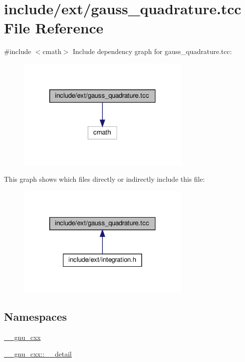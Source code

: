 \hypertarget{gauss__quadrature_8tcc}{}\section{include/ext/gauss\+\_\+quadrature.tcc File Reference}
\label{gauss__quadrature_8tcc}
{\ttfamily \#include $<$cmath$>$}\newline
Include dependency graph for gauss\+\_\+quadrature.\+tcc\+:
\nopagebreak
\begin{figure}[H]
\begin{center}
\leavevmode
\includegraphics[width=241pt]{gauss__quadrature_8tcc__incl}
\end{center}
\end{figure}
This graph shows which files directly or indirectly include this file\+:
\nopagebreak
\begin{figure}[H]
\begin{center}
\leavevmode
\includegraphics[width=241pt]{gauss__quadrature_8tcc__dep__incl}
\end{center}
\end{figure}
\subsection*{Namespaces}
\begin{DoxyCompactItemize}
\item 
 \hyperlink{namespace____gnu__cxx}{\+\_\+\+\_\+gnu\+\_\+cxx}
\item 
 \hyperlink{namespace____gnu__cxx_1_1____detail}{\+\_\+\+\_\+gnu\+\_\+cxx\+::\+\_\+\+\_\+detail}
\end{DoxyCompactItemize}
